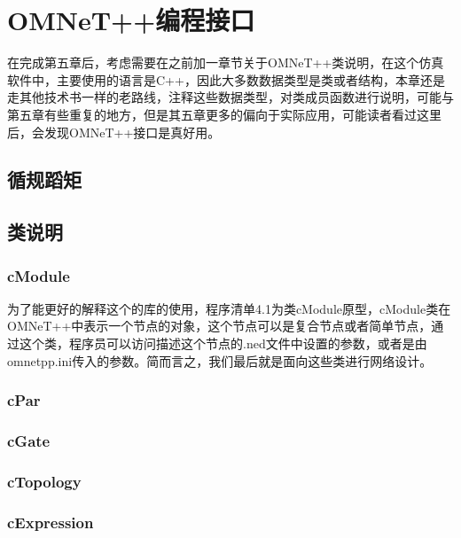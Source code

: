 \chapter{OMNeT++编程接口}

\begin{summary}
在完成第五章后，考虑需要在之前加一章节关于OMNeT++类说明，在这个仿真软件中，主要使用的语言是C++，因此大多数数据类型是类或者结构，本章还是走其他技术书一样的老路线，注释这些数据类型，对类成员函数进行说明，可能与第五章有些重复的地方，但是其五章更多的偏向于实际应用，可能读者看过这里后，会发现OMNeT++接口是真好用。\\
\end{summary}

\section{循规蹈矩}


\section{类说明}



\subsection{cModule}
为了能更好的解释这个的库的使用，程序清单4.1为类cModule原型，cModule类在OMNeT++中表示一个节点的对象，这个节点可以是复合节点或者简单节点，通过这个类，程序员可以访问描述这个节点的.ned文件中设置的参数，或者是由omnetpp.ini传入的参数。简而言之，我们最后就是面向这些类进行网络设计。


\subsection{cPar}


\subsection{cGate}


\subsection{cTopology}


\subsection{cExpression}



